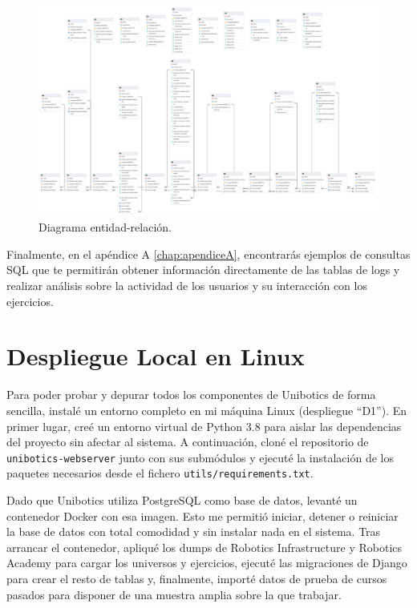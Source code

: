 \documentclass[a4paper, 12pt]{book}
\begin{document}
\begin{landscape}
    \begin{figure}[H]
        \centering
        \includegraphics[height=0.9\textheight, keepaspectratio]{img/ER.png}
        \caption{Diagrama entidad-relación.}
        \label{fig:ER}
    \end{figure}
\end{landscape}
    


Finalmente, en el apéndice A \ref{chap:apendiceA}, encontrarás ejemplos de consultas SQL que te permitirán obtener información directamente de las tablas de logs y realizar análisis sobre la actividad de los usuarios y su interacción con los ejercicios.

\section{Despliegue Local en Linux}

Para poder probar y depurar todos los componentes de Unibotics de forma sencilla, instalé un entorno completo en mi máquina Linux (despliegue “D1”). En primer lugar, creé un entorno virtual de Python 3.8 para aislar las dependencias del proyecto sin afectar al sistema. A continuación, cloné el repositorio de \texttt{unibotics-webserver} junto con sus submódulos y ejecuté la instalación de los paquetes necesarios desde el fichero \texttt{utils/requirements.txt}.  

Dado que Unibotics utiliza PostgreSQL como base de datos, levanté un contenedor Docker con esa imagen. Esto me permitió iniciar, detener o reiniciar la base de datos con total comodidad y sin instalar nada en el sistema. Tras arrancar el contenedor, apliqué los dumps de Robotics Infrastructure y Robotics Academy para cargar los universos y ejercicios, ejecuté las migraciones de Django para crear el resto de tablas y, finalmente, importé datos de prueba de cursos pasados para disponer de una muestra amplia sobre la que trabajar.
\end{document}
